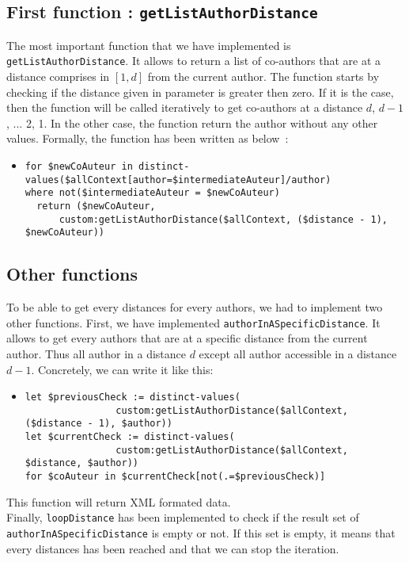 \documentclass{article}
\begin{document}
  \subsection{First function : \texttt{getListAuthorDistance}}
  The most important function that we have implemented is \verb|getListAuthorDistance|. It allows to return a list of co-authors that are at a distance comprises in $[1,d]$ from the current author. The function starts by checking if the distance given in parameter is greater then zero. If it is the case, then the function will be called iteratively to get co-authors at a distance $d$, $d-1$, ... 2, 1. In the other case, the function return the author without any other values. Formally, the function has been written as below~:
    \begin{itemize}
      \item \begin{verbatim}
for $newCoAuteur in distinct-values($allContext[author=$intermediateAuteur]/author)
where not($intermediateAuteur = $newCoAuteur)
  return ($newCoAuteur, 
      custom:getListAuthorDistance($allContext, ($distance - 1), $newCoAuteur))\end{verbatim}
    \end{itemize}
    
  \subsection{Other functions}
    To be able to get every distances for every authors, we had to implement two other functions. First, we have implemented \verb|authorInASpecificDistance|. It allows to get every authors that are at a specific distance from the current author. Thus all author in a distance $d$ except all author accessible in a distance $d-1$. Concretely, we can write it like this:
    \begin{itemize}
      \item \begin{verbatim}
let $previousCheck := distinct-values(
                custom:getListAuthorDistance($allContext, ($distance - 1), $author))
let $currentCheck := distinct-values(
                custom:getListAuthorDistance($allContext, $distance, $author))
for $coAuteur in $currentCheck[not(.=$previousCheck)]\end{verbatim}
    \end{itemize}
    This function will return XML formated data.\\
    Finally, \verb|loopDistance| has been implemented to check if the result set of \verb|authorInASpecificDistance| is empty or not. If this set is empty, it means that every distances has been reached and that we can stop the iteration.
  
\end{document}
